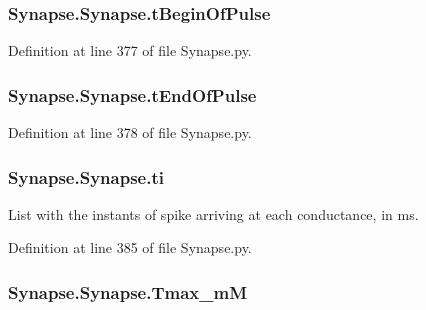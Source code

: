 \subsubsection[{\texorpdfstring{t\+Begin\+Of\+Pulse}{tBeginOfPulse}}]{\setlength{\rightskip}{0pt plus 5cm}Synapse.\+Synapse.\+t\+Begin\+Of\+Pulse}\hypertarget{class_synapse_1_1_synapse_acdc426c52a2a13183d5f8c54a830bfa2}{}\label{class_synapse_1_1_synapse_acdc426c52a2a13183d5f8c54a830bfa2}


Definition at line 377 of file Synapse.\+py.

\subsubsection[{\texorpdfstring{t\+End\+Of\+Pulse}{tEndOfPulse}}]{\setlength{\rightskip}{0pt plus 5cm}Synapse.\+Synapse.\+t\+End\+Of\+Pulse}\hypertarget{class_synapse_1_1_synapse_adfd02fa815d45efd0cb1bc0124fe2c90}{}\label{class_synapse_1_1_synapse_adfd02fa815d45efd0cb1bc0124fe2c90}


Definition at line 378 of file Synapse.\+py.

\subsubsection[{\texorpdfstring{ti}{ti}}]{\setlength{\rightskip}{0pt plus 5cm}Synapse.\+Synapse.\+ti}\hypertarget{class_synapse_1_1_synapse_a714c95723607acad52af96ad55b6c575}{}\label{class_synapse_1_1_synapse_a714c95723607acad52af96ad55b6c575}


List with the instants of spike arriving at each conductance, in ms. 



Definition at line 385 of file Synapse.\+py.

\subsubsection[{\texorpdfstring{Tmax\+\_\+mM}{Tmax_mM}}]{\setlength{\rightskip}{0pt plus 5cm}Synapse.\+Synapse.\+Tmax\+\_\+mM}\hypertarget{class_synapse_1_1_synapse_ae4bcd698c5be77c2a6629d511d75f046}{}\label{class_synapse_1_1_synapse_ae4bcd698c5be77c2a6629d511d75f046}


